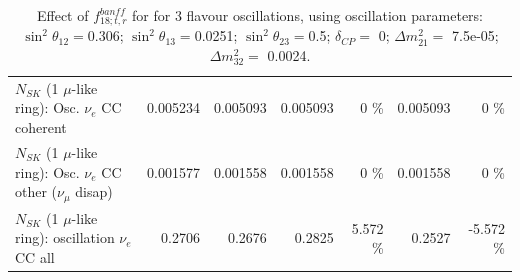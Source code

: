 \begin{table}
\begin{tabular}{| l | r | r | r  r | r  r |}
                          $N_{SK}$ (1 $\mu$-like ring): Osc. $\nu_e$ CC coherent &        0.005234 &        0.005093 &        0.005093 &        0 \%  &        0.005093 &        0 \%  \\ 
           $N_{SK}$ (1 $\mu$-like ring): Osc. $\nu_e$ CC other ($\nu_\mu$ disap) &        0.001577 &        0.001558 &        0.001558 &        0 \%  &        0.001558 &        0 \%  \\ 
                        $N_{SK}$ (1 $\mu$-like ring): oscillation $\nu_e$ CC all &          0.2706 &          0.2676 &          0.2825 &    5.572 \%  &          0.2527 &   -5.572 \%  \\ 
\hline
\hline
\end{tabular}
\caption{ Effect of $f_{18; t, r}^{banff}$ for for 3 flavour oscillations, using oscillation parameters:  $\sin^2\theta_{12} = $0.306; $\sin^2\theta_{13} = $0.0251; $\sin^2\theta_{23} = $0.5; $\delta_{CP} = $        0; $\Delta m^2_{21} = $    7.5e-05; $\Delta m^2_{32} = $    0.0024. }
\label{tab:num_banff_ccqeE0_1RmuT_3f_osc_t13:0.0251}
\end{table}
\clearpage

